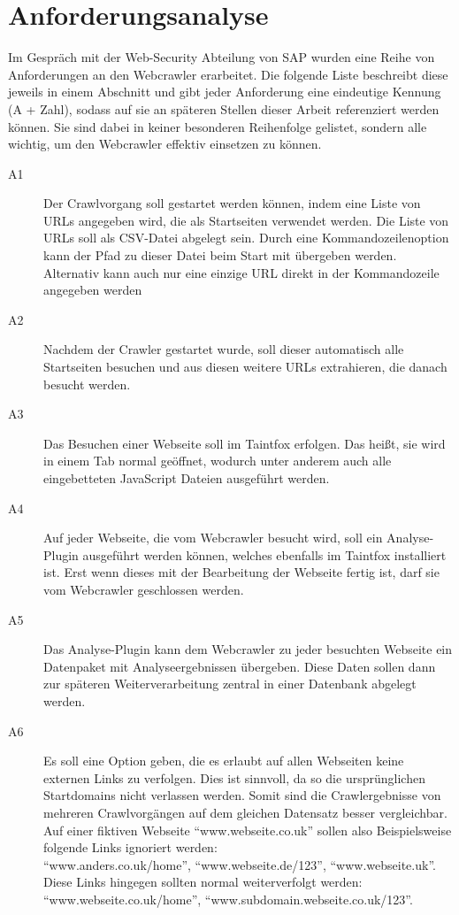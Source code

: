 \section{Anforderungsanalyse}
Im Gespräch mit der Web-Security Abteilung von SAP wurden eine Reihe von Anforderungen an den Webcrawler erarbeitet. Die folgende Liste beschreibt diese jeweils in einem Abschnitt und gibt jeder Anforderung eine eindeutige Kennung (A + Zahl), sodass auf sie an späteren Stellen dieser Arbeit referenziert werden können. Sie sind dabei in keiner besonderen Reihenfolge gelistet, sondern alle wichtig, um den Webcrawler effektiv einsetzen zu können.
\begin{description}
	\item[ A1 ] Der Crawlvorgang soll gestartet werden können, indem eine Liste von URLs angegeben wird, die als Startseiten verwendet werden. Die Liste von URLs soll als CSV-Datei abgelegt sein. Durch eine Kommandozeilenoption kann der Pfad zu dieser Datei beim Start mit übergeben werden. Alternativ kann auch nur eine einzige URL direkt in der Kommandozeile angegeben werden
	\item[ A2 ] Nachdem der Crawler gestartet wurde, soll dieser automatisch alle Startseiten besuchen und aus diesen weitere URLs extrahieren, die danach besucht werden.
	\item[ A3 ] Das Besuchen einer Webseite soll im Taintfox erfolgen. Das heißt, sie wird in einem Tab normal geöffnet, wodurch unter anderem auch alle eingebetteten JavaScript Dateien ausgeführt werden. 
	\item[ A4 ] Auf jeder Webseite, die vom Webcrawler besucht wird, soll ein Analyse-Plugin ausgeführt werden können, welches ebenfalls im Taintfox installiert ist. Erst wenn dieses mit der Bearbeitung der Webseite fertig ist, darf sie vom Webcrawler geschlossen werden.
	\item[ A5 ] Das Analyse-Plugin kann dem Webcrawler zu jeder besuchten Webseite ein Datenpaket mit Analyseergebnissen übergeben. Diese Daten sollen dann zur späteren Weiterverarbeitung zentral in einer Datenbank abgelegt werden.
	\item[ A6 ] Es soll eine Option geben, die es erlaubt auf allen Webseiten keine externen Links zu verfolgen. Dies ist sinnvoll, da so die ursprünglichen Startdomains nicht verlassen werden. Somit sind die Crawlergebnisse von mehreren Crawlvorgängen auf dem gleichen Datensatz besser vergleichbar. Auf einer fiktiven Webseite \enquote{www.webseite.co.uk} sollen also Beispielsweise folgende Links ignoriert werden: \\ \enquote{www.anders.co.uk/home}, \enquote{www.webseite.de/123}, \enquote{www.webseite.uk}. Diese Links hingegen sollten normal weiterverfolgt werden: \\  \enquote{www.webseite.co.uk/home},  \enquote{www.subdomain.webseite.co.uk/123}. \\

\end{description}

